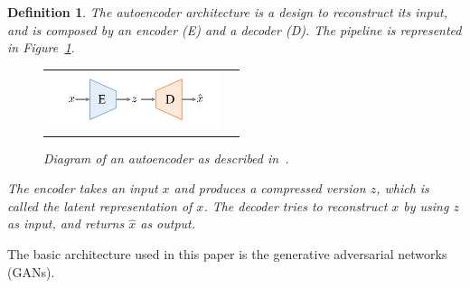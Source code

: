 \documentclass[12pt]{article}
\newtheorem{definition}{Definition}
\begin{document}
    \begin{definition}
        \normalfont
        The \emph{autoencoder} architecture is a design to reconstruct its input, and is composed by an \emph{encoder} (E) and a \emph{decoder} (D). The pipeline is represented in Figure~\ref{figure:diagram_of_autoencoder}.

        \begin{figure}[H]
            \centering
            \begin{tabular}{cc}
                \includegraphics[width = 50mm]{autoencoder}
            \end{tabular}
            \caption{Diagram of an autoencoder as described in~\cite{pmlr-v80-achlioptas18a}.}
            \label{figure:diagram_of_autoencoder}
        \end{figure}

        The encoder takes an input $x$ and produces a compressed version $z$, which is called the \emph{latent representation} of $x$. The decoder tries to reconstruct $x$ by using $z$ as input, and returns $\hat{x}$ as output.
        \label{definition:autoencoder}
    \end{definition}

    The basic architecture used in this paper is the generative adversarial networks (GANs).
\end{document}
